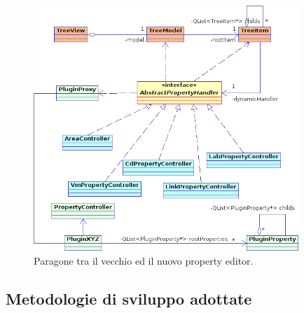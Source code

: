 \begin{figure}[!htb]
	\centering
	\includegraphics[width=10cm]{images/properties_uml1.png}
	\caption{Paragone tra il vecchio ed il nuovo property editor.}
	\label{figura:property_editor_paragone}
\end{figure}


\subsection{Metodologie di sviluppo adottate}

